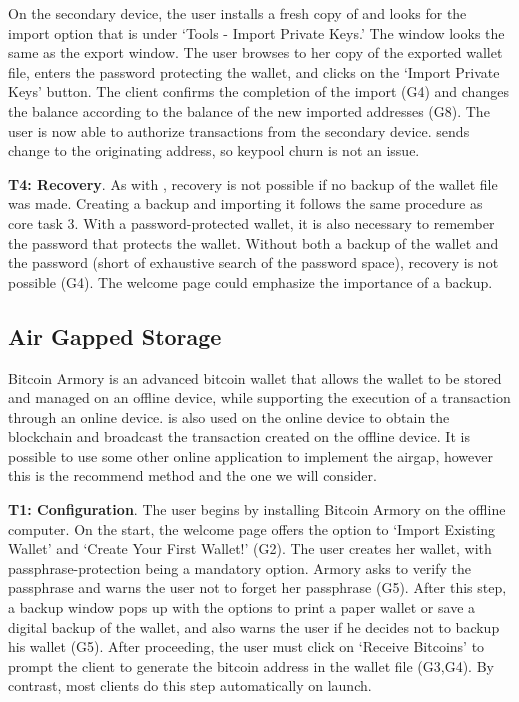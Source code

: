 On the secondary device, the user installs a fresh copy of \multibit and looks for the import option that is under `Tools - Import Private Keys.' The window looks the same as the export window. The user browses to her copy of the exported wallet file, enters the password protecting the wallet, and clicks on the `Import Private Keys' button. The client confirms the completion of the import (G4) and changes the balance according to the balance of the new imported addresses (G8). The user is now able to authorize transactions from the secondary device. \multibit sends change to the originating address, so keypool churn is not an issue.


\textbf{T4: Recovery}.
As with \bitcoinclient, recovery is not possible if no backup of the wallet file was made. Creating a backup and importing it follows the same procedure as core task 3. With a password-protected wallet, it is also necessary to remember the password that protects the wallet. Without both a backup of the wallet and the password (short of exhaustive search of the password space), recovery is not possible (G4). The welcome page could emphasize the importance of a backup. 

\subsection{Air Gapped Storage}
\label{air gap}
Bitcoin Armory is an advanced bitcoin wallet that allows the wallet to be stored and managed on an offline device, while supporting the execution of a transaction through an online device. \armory is also used on the online device to obtain the blockchain and broadcast the transaction created on the offline device. It is possible to use some other online application to implement the airgap, however this is the recommend method and the one we will consider.

\textbf{T1: Configuration}.
The user begins by installing Bitcoin Armory on the offline computer. On the start, the welcome page offers the option to `Import Existing Wallet' and `Create Your First Wallet!' (G2). The user creates her wallet, with passphrase-protection being a mandatory option. Armory asks to verify the passphrase and warns the user not to forget her passphrase (G5). After this step, a backup window pops up with the options to print a paper wallet or save a digital backup of the wallet, and also warns the user if he decides not to backup his wallet (G5). After proceeding, the user must click on `Receive Bitcoins' to prompt the client to generate the bitcoin address in the wallet file (G3,G4). By contrast, most clients do this step automatically on launch. 


